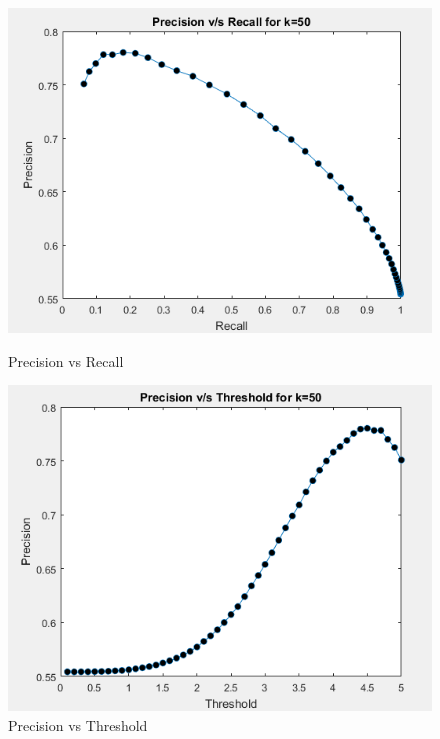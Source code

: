 \documentclass[12pt, onecolumn]{IEEEtran}
\begin{document}
\begin{figure}[h!]
\centering
\begin{minipage}{.5\textwidth}
\centering
\captionsetup{justification=centering}
\includegraphics[width=0.9\linewidth]{Graphs/3-2}
\caption{Precision vs Recall}
\end{minipage}%
\begin{minipage}{.5\textwidth}
\centering
\captionsetup{justification=centering}
\includegraphics[width=0.9\linewidth]{Graphs/3-5}
\caption{Precision vs Threshold}
\end{minipage}
\end{figure}
\end{document}
